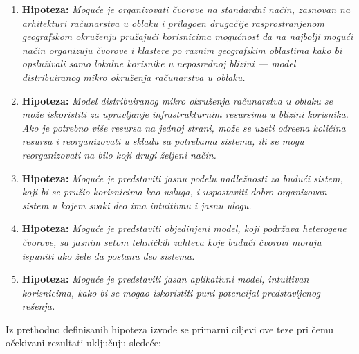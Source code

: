 \begin{enumerate}[start=1,label={(\bfseries \arabic*)}]
	\item \textbf{Hipoteza:} \textit{Mogu\'ce je organizovati \v cvorove na standardni na\v cin, zasnovan na arhitekturi ra\v cunarstva u oblaku i prilago\dj en druga\v cije rasprostranjenom geografskom okru\v zenju pru\v zaju\'ci korisnicima mogu\'cnost da na najbolji mogu\'ci na\v cin organizuju \v cvorove i klastere po raznim geografskim oblastima kako bi opslu\v zivali samo lokalne korisnike u neposrednoj blizini --- model distribuiranog mikro okru\v zenja ra\v cunarstva u oblaku.}
	\item \textbf{Hipoteza:} \textit{Model distribuiranog mikro okru\v zenja ra\v cunarstva u oblaku se mo\v ze iskoristiti za upravljanje infrastrukturnim resursima u blizini korisnika. Ako je potrebno vi\v se resursa na jednoj strani, mo\v ze se uzeti odre\dj ena koli\v cina resursa i reorganizovati u skladu sa potrebama sistema, ili se mogu reorganizovati na bilo koji drugi \v zeljeni na\v cin.}
	\item \textbf{Hipoteza:} \textit{Mogu\'ce je predstaviti jasnu podelu nadle\v znosti za budu\'ci sistem, koji bi se pru\v zio korisnicima kao usluga, i uspostaviti dobro organizovan sistem u kojem svaki deo ima intuitivnu i jasnu ulogu.}
	\item \textbf{Hipoteza:} \textit{Mogu\'ce je predstaviti objedinjeni model, koji podr\v zava heterogene \v cvorove, sa jasnim setom tehni\v ckih zahteva koje budu\'ci \v cvorovi moraju ispuniti ako \v zele da postanu deo sistema.}
	\item \textbf{Hipoteza:} \textit{Mogu\'ce je predstaviti jasan aplikativni model, intuitivan korisnicima, kako bi se mogao iskoristiti puni potencijal predstavljenog re\v senja.}
\end{enumerate}

Iz prethodno definisanih hipoteza izvode se primarni ciljevi ove teze pri \v cemu o\v cekivani rezultati uklju\v cuju slede\'ce:

